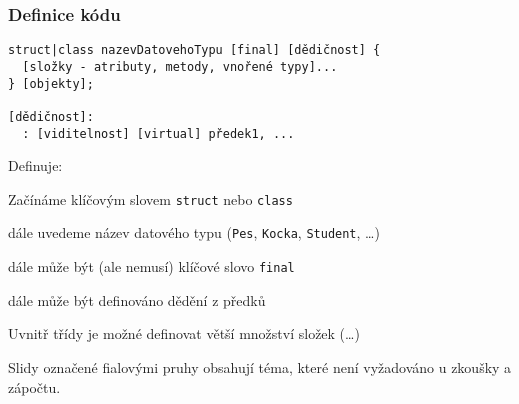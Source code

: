 \begin{frame}[fragile]
\frametitle{Definice kódu}
\vfill
\begin{noteblock}{}
\begin{lstlisting}[basicstyle=\small]
struct|class nazevDatovehoTypu [final] [dědičnost] {
  [složky - atributy, metody, vnořené typy]...
} [objekty];

[dědičnost]:
  : [viditelnost] [virtual] předek1, ...
\end{lstlisting}
\end{noteblock}
\vfill
\begin{bitemize}{Definuje:}
\item Začínáme klíčovým slovem \lstinline|struct| nebo \lstinline|class|
\item dále uvedeme název datového typu (\lstinline|Pes|, \lstinline|Kocka|, \lstinline|Student|, \ldots)
\item dále může být (ale nemusí) klíčové slovo \lstinline|final|
\item dále může být definováno dědění z předků
\item[]
\item Uvnitř třídy je možné definovat větší množství složek (\ldots)
\end{bitemize}
\vfill
\end{frame}








\nezkouskove
\begin{frame}[fragile]
\begin{center}
\large Slidy označené fialovými pruhy obsahují téma, které není vyžadováno u zkoušky a zápočtu.
\end{center}
\end{frame}
\zkouskove